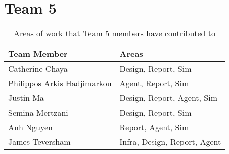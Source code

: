 \section{Team 5}
\label{sec:roles_appendix:team5}

\begin{table}[!h]
    \centering
    \begin{tabular}{|l|l|}
    \hline
    \textbf{Team Member} & \textbf{Areas}     \\ \hline
    Catherine Chaya  & Design, Report, Sim         \\
    Philippos Arkis Hadjimarkou  & Agent, Report, Sim                 \\
    Justin Ma     & Design, Report, Agent, Sim        \\
    Semina Mertzani     & Design, Report, Sim \\
    Anh Nguyen    & Report, Agent, Sim                      \\
    James Teversham  & Infra, Design, Report, Agent                        \\
    \hline
\end{tabular}
\caption{Areas of work that Team 5 members have contributed to}
\label{sec:roles_appendix:team5}
\end{table}
